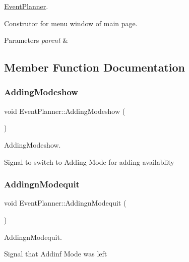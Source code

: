 \hyperlink{class_event_planner}{Event\+Planner}. 

Construtor for menu window of main page. 
\begin{DoxyParams}{Parameters}
{\em parent} & \\
\hline
\end{DoxyParams}


\subsection{Member Function Documentation}
\mbox{\label{class_event_planner_ac29d7162ba23478a3ca83d9a3451317e}} 
\subsubsection{\texorpdfstring{Adding\+Modeshow}{AddingModeshow}}
{\footnotesize\ttfamily void Event\+Planner\+::\+Adding\+Modeshow (\begin{DoxyParamCaption}{ }\end{DoxyParamCaption})\hspace{0.3cm}{\ttfamily [signal]}}



Adding\+Modeshow. 

Signal to switch to Adding Mode for adding availablity \mbox{\label{class_event_planner_a11d013b57831e685d134d824db883ad3}} 
\subsubsection{\texorpdfstring{Addingn\+Modequit}{AddingnModequit}}
{\footnotesize\ttfamily void Event\+Planner\+::\+Addingn\+Modequit (\begin{DoxyParamCaption}{ }\end{DoxyParamCaption})\hspace{0.3cm}{\ttfamily [signal]}}



Addingn\+Modequit. 

Signal that Addinf Mode was left \mbox{\label{class_event_planner_ab721a944eda1470ebb158bc815cc8734}} 
